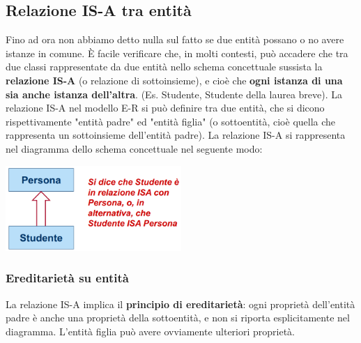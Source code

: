 \documentclass[12pt]{article}
\begin{document}
\subsection{Relazione IS-A tra entità}
Fino ad ora non abbiamo detto nulla sul fatto se due entità possano o no avere istanze in comune.
È facile verificare che, in molti contesti, può accadere che tra due classi rappresentate da due entità nello schema concettuale sussista la \textbf{relazione IS-A} (o relazione di sottoinsieme), e cioè che \textbf{ogni istanza di una sia anche istanza dell'altra}.
(Es. Studente, Studente della laurea breve).
La relazione IS-A nel modello E-R si può definire tra due entità, che si dicono rispettivamente "entità padre" ed "entità figlia" (o sottoentità, cioè quella che rappresenta un sottoinsieme dell'entità padre).
La relazione IS-A si rappresenta nel diagramma dello schema concettuale nel seguente modo:
\begin{center}
    \includegraphics[width = 0.50\textwidth]{Images/36.PNG}
\end{center}
\subsubsection{Ereditarietà su entità}
La relazione IS-A implica il \textbf{principio di ereditarietà}: ogni proprietà dell'entità padre è anche una proprietà della sottoentità, e non si riporta esplicitamente nel diagramma.
L'entità figlia può avere ovviamente ulteriori proprietà.
\end{document}
